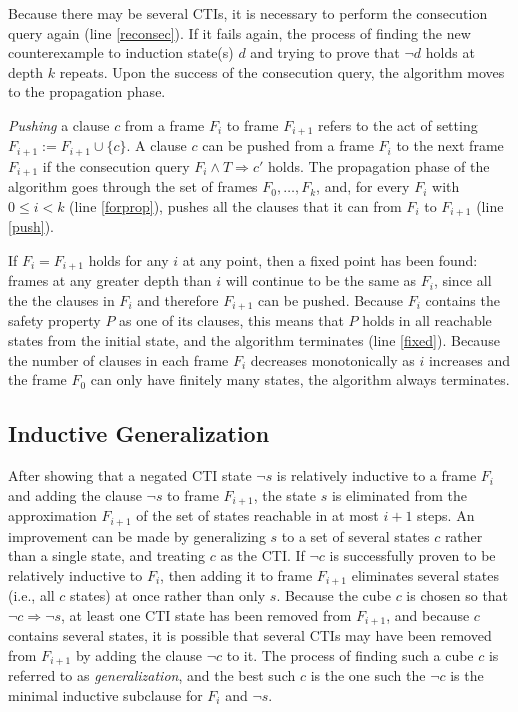 \documentclass[12pt,a4paper,twoside,openright]{report}
\begin{document}
{Because there may be several CTIs, it is necessary to
perform the consecution query again (line \ref{reconsec}). If it fails again,
the process of finding the new counterexample to induction state(s) $d$ and trying to
prove that $\neg d$ holds at depth $k$ repeats. Upon the success of the consecution
query, the algorithm moves to the propagation phase.

\emph{Pushing} a clause $c$ from a frame $F_i$ to frame $F_{i + 1}$ refers to the act
of setting $F_{i + 1} := F_{i + 1} \cup \{ c \}$.
A clause $c$ can be pushed from a frame $F_i$ to the next frame $F_{i + 1}$
if the consecution query $F_i \wedge T \Rightarrow c'$ holds.
The propagation phase of the algorithm goes through the set of frames
$F_0, \ldots, F_k$, and, for every $F_i$ with $0 \leq i < k$ (line \ref{forprop}),
pushes all the clauses that it can from $F_i$ to $F_{i + 1}$ (line \ref{push}).

If $F_i = F_{i + 1}$ holds for any $i$ at any point, then a fixed point has
been found: frames at any greater depth than $i$ will continue to be the
same as $F_i$, since all the the clauses in $F_i$ and therefore $F_{i + 1}$
can be pushed.
Because $F_i$ contains the safety property $P$ as one of its clauses,
this means that $P$ holds in all reachable states from the initial state,
and the algorithm terminates (line \ref{fixed}). Because the number of
clauses in each frame $F_i$ decreases monotonically as $i$ increases and the
frame $F_0$ can only have finitely many states, the algorithm always
terminates.

\subsection{Inductive Generalization}

After showing that a negated CTI state $\neg s$ is relatively inductive to a
frame $F_i$ and adding the clause $\neg s$ to frame $F_{i + 1}$, the state
$s$ is eliminated from the approximation $F_{i + 1}$ of the set of states
reachable in at most $i + 1$ steps. An improvement can be made by generalizing
$s$ to a set of several states $c$ rather than a single state, and treating
$c$ as the CTI. If $\neg c$ is successfully proven to be relatively inductive
to $F_i$, then adding it to frame $F_{i + 1}$ eliminates several states (i.e.,
all $c$ states) at once rather than only $s$. Because the cube $c$
is chosen so that $\neg c \Rightarrow \neg s$, at least one CTI state
has been removed from $F_{i + 1}$, and because $c$ contains several states,
it is possible that several CTIs may have been removed from $F_{i + 1}$
by adding the clause $\neg c$ to it. The process of finding such a cube $c$
is referred to as \emph{generalization}, and the best such $c$ is the
one such the $\neg c$ is the minimal inductive subclause for $F_i$ and $\neg s$.

}
\end{document}
